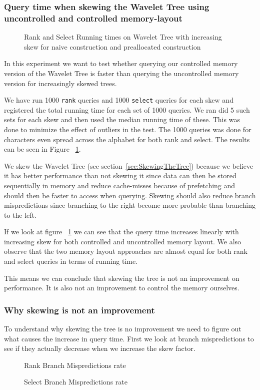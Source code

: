\subsubsection{Query time when skewing the Wavelet Tree using uncontrolled and controlled memory-layout}

\begin{figure}
\caption{Rank and Select Running times on Wavelet Tree with increasing skew for naive construction and preallocated construction}
\label{fig:NaiveRankSelectSkewRunningTime}

\end{figure}


In this experiment we want to test whether querying our controlled memory version of the Wavelet Tree is faster than querying the uncontrolled memory version for increasingly skewed trees. 

We have run 1000 \texttt{rank} queries and 1000 \texttt{select} queries for each skew and registered the total running time for each set of 1000 queries. 
We ran did 5 such sets for each skew and then used the median running time of these. 
This was done to minimize the effect of outliers in the test. The 1000 queries was done for characters even spread across the alphabet for both rank and select. The results can be seen in Figure ~\ref{fig:NaiveRankSelectSkewRunningTime}.

We skew the Wavelet Tree (see section~\ref{sec:SkewingTheTree}) because we believe it has better performance than not skewing it since data can then be stored sequentially in memory and reduce cache-misses because of prefetching and should then be faster to access when querying. 
Skewing should also reduce branch mispredictions since branching to the right become more probable than branching to the left. 

If we look at figure ~\ref{fig:NaiveRankSelectSkewRunningTime} we can see that the query time increases linearly with increasing skew for both controlled and uncontrolled memory layout. We also observe that the two memory layout approaches are almost equal for both rank and select queries in terms of running time.

This means we can conclude that skewing the tree is not an improvement on performance. It is also not an improvement to control the memory ourselves.

\subsubsection{Why skewing is not an improvement}
To understand why skewing the tree is no improvement we need to figure out what causes the increase in query time. 
First we look at branch mispredictions to see if they actually decrease when we increase the skew factor.%
\begin{figure}
\caption{Rank Branch Mispredictions rate}
\label{fig:NaiveVsPreallocatedSkewRankQueryBMrate}

\end{figure}%
\begin{figure}
\caption{Select Branch Mispredictions rate}
\label{fig:NaiveVsPreallocatedSkewSelectQueryBMrate}

\end{figure}
 
